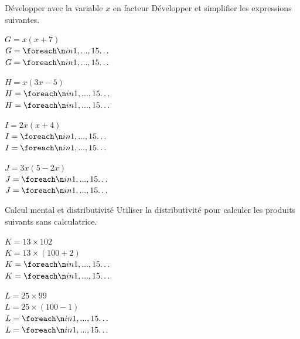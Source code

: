 \documentclass[a4paper]{book}
\begin{document}
    \vspace{0.5cm}
    
    \begin{exerciceTitre}{Développer avec la variable $x$ en facteur}
        Développer et simplifier les expressions suivantes.
        \vspace{0.3cm}
        
        \begin{minipage}[t]{0.48\textwidth}
        $G = x(x + 7)$ \\
        $G = \points[15]$ \\
        $G = \points[15]$
        \end{minipage}
        \hfill
        \begin{minipage}[t]{0.48\textwidth}
        $H = x(3x - 5)$ \\
        $H = \points[15]$ \\
        $H = \points[15]$
        \end{minipage}
        
        \vspace{0.8cm}
        
        \begin{minipage}[t]{0.48\textwidth}
        $I = 2x(x + 4)$ \\
        $I = \points[15]$ \\
        $I = \points[15]$
        \end{minipage}
        \hfill
        \begin{minipage}[t]{0.48\textwidth}
        $J = 3x(5 - 2x)$ \\
        $J = \points[15]$ \\
        $J = \points[15]$
        \end{minipage}
    \end{exerciceTitre}
    
    \vspace{0.5cm}
    
    \begin{exerciceTitre}{Calcul mental et distributivité}
        Utiliser la distributivité pour calculer les produits suivants sans calculatrice.
        \vspace{0.3cm}
        
        \begin{minipage}[t]{0.48\textwidth}
        $K = 13 \times 102$ \\
        $K = 13 \times (100 + 2)$ \\
        $K = \points[15]$ \\
        $K = \points[15]$
        \end{minipage}
        \hfill
        \begin{minipage}[t]{0.48\textwidth}
        $L = 25 \times 99$ \\
        $L = 25 \times (100 - 1)$ \\
        $L = \points[15]$ \\
        $L = \points[15]$
        \end{minipage}
    \end{exerciceTitre}
        
\end{document}

